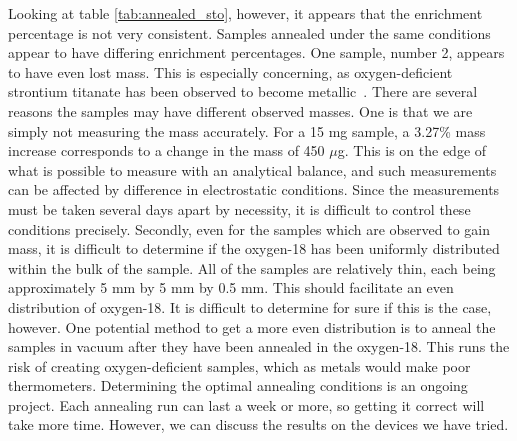 \documentclass{thesis-umich}
\begin{document}
Looking at table \ref{tab:annealed_sto}, however, it appears that the enrichment percentage is not very consistent. Samples annealed under the same conditions appear to have differing enrichment percentages. One sample, number 2, appears to have even lost mass. This is especially concerning, as oxygen-deficient strontium titanate has been observed to become metallic~\cite{Pallecchi2001}. There are several reasons the samples may have different observed masses. One is that we are simply not measuring the mass accurately. For a 15 mg sample, a 3.27\% mass increase corresponds to a change in the mass of 450 $\mu$g. This is on the edge of what is possible to measure with an analytical balance, and such measurements can be affected by difference in electrostatic conditions. Since the measurements must be taken several days apart by necessity, it is difficult to control these conditions precisely. Secondly, even for the samples which are observed to gain mass, it is difficult to determine if the oxygen-18 has been uniformly distributed within the bulk of the sample. All of the samples are relatively thin, each being approximately 5 mm by 5 mm by 0.5 mm. This should facilitate an even distribution of oxygen-18. It is difficult to determine for sure if this is the case, however. One potential method to get a more even distribution is to anneal the samples in vacuum after they have been annealed in the oxygen-18. This runs the risk of creating oxygen-deficient samples, which as metals would make poor thermometers. Determining the optimal annealing conditions is an ongoing project. Each annealing run can last a week or more, so getting it correct will take more time. However, we can discuss the results on the devices we have tried.
\end{document}
